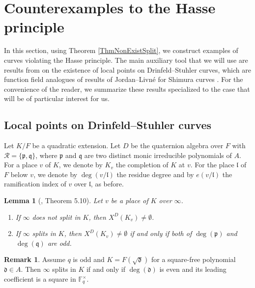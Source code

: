 \documentclass[10pt]{amsart}
\theoremstyle{plain}
\newtheorem{lem}[thm]{Lemma}
\theoremstyle{definition}
\newtheorem{rmk}[thm]{Remark}
\newcommand{\cR}{\mathcal{R}}
\newcommand{\bF}{\mathbb{F}}
\newcommand{\frd}{\mathfrak{d}}
\newcommand{\frl}{\mathfrak{l}}
\newcommand{\frp}{\mathfrak{p}}
\newcommand{\frq}{\mathfrak{q}}
\begin{document}


\section{Counterexamples to the Hasse principle}\label{SecHPV}

In this section, using Theorem \ref{ThmNonExistSplit}, we construct examples of curves violating the Hasse principle.
The main auxiliary tool that we will use are results from \cite{Pap_loc} on the existence of local points on Drinfeld--Stuhler curves,
which are function field analogues of results of Jordan--Livn\'{e} for Shimura curves \cite{JL}. For the convenience of the reader, we summarize 
these results specialized to the case that will be of particular interest for us.

\subsection{Local points on Drinfeld--Stuhler curves}\label{SubsecLocalPointsDSC}

Let $K/F$ be a quadratic extension. Let $D$ be the quaternion algebra over $F$ with $\cR=\{\frp,\frq\}$, where $\frp$ and $\frq$ are two distinct
monic irreducible polynomials of $A$.
For a place $v$ of $K$, we denote by $K_v$ the completion of $K$ at $v$. For the place $\frl$ of $F$ below $v$, we denote 
by $\deg(v/\frl)$ the residue degree and by $e(v/\frl)$ the ramification index of $v$ over $\frl$, as before.

\begin{lem}[\cite{Pap_loc}, Theorem 5.10]\label{LemPapInfty}
	Let $v$ be a place of $K$ over $\infty$.
	\begin{enumerate}
		\item If $\infty$ does not split in $K$, then $X^D(K_{v})\neq\emptyset$.
		\item If $\infty$ splits in $K$, then $X^D(K_{v})\neq\emptyset$ if and only if both of $\deg(\frp)$ and $\deg(\frq)$ are odd.
	\end{enumerate}
\end{lem}

\begin{rmk}\label{RmkSplitInfty}
Assume $q$ is odd and $K=F(\sqrt{\frd})$ for a square-free polynomial $\frd\in A$. Then
$\infty$ splits in $K$ if and only if $\deg(\frd)$ is even and its leading coefficient is a square in $\bF_q^\times$.
\end{rmk}
\end{document}
